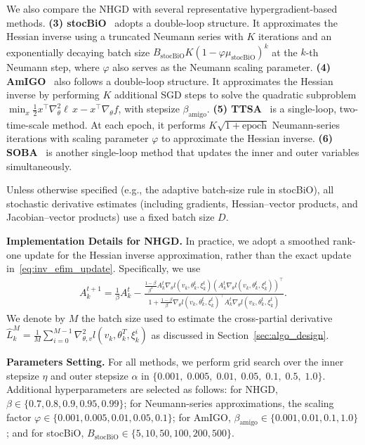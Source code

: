 \documentclass[11 pt]{article}
\begin{document}
We also compare the NHGD with several representative hypergradient-based methods. \textbf{(3) stocBiO}~\cite{ji2021bilevel} adopts a double-loop structure. 
It approximates the Hessian inverse using a truncated Neumann series with $K$ iterations and an exponentially decaying batch size 
$B_{\text{stocBiO}} K (1-\varphi \mu_{\text{stocBiO}})^k$ at the $k$-th Neumann step, where $\varphi$ also serves as the Neumann scaling parameter. \textbf{(4) AmIGO}~\cite{arbel2021amortized} also follows a double-loop structure.
It approximates the Hessian inverse by performing $K$ additional SGD steps to solve the quadratic subproblem
$\min_x \tfrac{1}{2} x^\top \nabla_\theta^2 \ell\, x - x^\top \nabla_\theta f$,
with stepsize $\beta_{\text{amigo}}$. \textbf{(5) TTSA}~\cite{hong2023two} is a single-loop, two-time-scale method. At each epoch, it performs $K\sqrt{1+\text{epoch}}$ Neumann-series iterations with scaling parameter $\varphi$ to approximate the Hessian inverse. \textbf{(6) SOBA}~\cite{dagreou2022framework} is another single-loop method that updates the inner and outer variables simultaneously. 


Unless otherwise specified (e.g., the adaptive batch-size rule in stocBiO), all stochastic derivative estimates (including gradients, Hessian--vector products, and Jacobian--vector products) use a fixed batch size $D$.

\textbf{Implementation Details for NHGD.} In practice, we adopt a smoothed rank-one update for the Hessian inverse approximation, rather than the exact update in~\eqref{eq:inv_efim_update}. Specifically, we use
\begin{align*}
    A_k^{t+1}=\frac{1}{\beta}A_k^t-\frac{\frac{1-\beta}{\beta^2}A_k^t\nabla_\theta l (v_k,\theta_k^t,\xi_k^t)\left(A_k^t\nabla_\theta l (v_k,\theta_k^t,\xi_k^t)\right)^\top}{1+\frac{1-\beta}{\beta}\nabla_\theta l (v_k,\theta_k^t,\xi_k^t)^\top A_k^t\nabla_\theta l (v_k,\theta_k^t,\xi_k^t)}.
\end{align*}
We denote by $M$ the batch size used to estimate the cross-partial derivative $\hat{L}_k^{M}
    =
    \frac{1}{M}
    \sum_{i=0}^{M-1}
    \nabla_{\theta,v}^2 l(v_k,\theta_k^{T},\xi_k^{i})$ as discussed in Section~\ref{sec:algo_design}. 

\textbf{Parameters Setting.} For all methods, we perform grid search over the inner stepsize $\eta$ and outer stepsize $\alpha$  in $\{0.001,\; 0.005,\; 0.01,\; 0.05,\; 0.1,\; 0.5,\; 1.0\}$. Additional hyperparameters are selected as follows:
for NHGD, $\beta \in \{0.7, 0.8, 0.9, 0.95, 0.99\}$;
for Neumann-series approximations, the scaling factor
$\varphi \in \{0.001, 0.005, 0.01, 0.05, 0.1\}$;
for AmIGO, $\beta_{\text{amigo}} \in \{0.001, 0.01, 0.1, 1.0\}$;
and for stocBiO, $B_{\text{stocBiO}} \in \{5, 10, 50, 100, 200, 500\}$.
\end{document}
